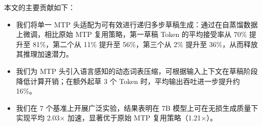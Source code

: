 \documentclass{article} %
\begin{document}
本文的主要贡献如下：
\begin{itemize}
    \item 我们将单一 MTP 头适配为可有效进行递归多步草稿生成：通过在自蒸馏数据上微调，相比原始 MTP 复用策略，第一草稿 Token 的平均接受率从 70\% 提升至 81\%，第二个从 11\% 提升至 56\%，第三个从 2\% 提升至 36\%，从而释放其推理加速潜力。

    \item 我们为 MTP 头引入语言感知的动态词表压缩，可根据输入上下文在草稿阶段降低计算开销；在额外起草 3 个 Token 时，平均输出吞吐进一步提升约 16\%。

    \item 我们在 7 个基准上开展广泛实验，结果表明在 7B 模型上可在无损生成质量下实现平均 2.03$\times$ 加速，显著优于原始 MTP 复用策略（1.21$\times$）。


\end{itemize}




\end{document}
